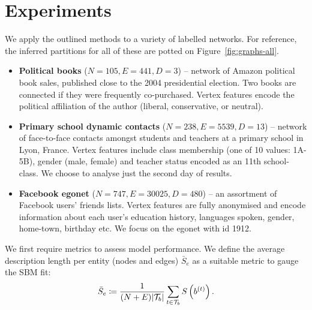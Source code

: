 \section{Experiments}
\label{sec:experiments}

We apply the outlined methods to a variety of labelled networks. For reference, the inferred partitions for all of these are potted on Figure~\ref{fig:graphs-all}.

\begin{itemize}
	\item \textbf{Political books} \cite{polbooks} ($N=105, E=441, D=3$) -- network of Amazon political book sales, published close to the 2004 presidential election. Two books are connected if they were frequently co-purchased. Vertex features encode the political affiliation of the author (liberal, conservative, or neutral).
	\item \textbf{Primary school dynamic contacts} \cite{schools} ($N=238, E=5539, D=13$) -- network of face-to-face contacts amongst students and teachers at a primary school in Lyon, France. Vertex features include class membership (one of 10 values: 1A-5B), gender (male, female) and teacher status encoded as an 11th school-class. We choose to analyse just the second day of results.
	\item \textbf{Facebook egonet} \cite{fb-snap} ($N=747, E=30025, D=480$) -- an assortment of Facebook users' friends lists. Vertex features are fully anonymised and encode information about each user's education history, languages spoken, gender, home-town, birthday etc. We focus on the egonet with id 1912.
\end{itemize}
%
We first require metrics to assess model performance. We define the average
description length per entity (nodes and edges) $\bar{S}_e$ as a suitable metric to gauge the SBM fit:
%
\begin{equation}
	\bar{S}_e \coloneqq \frac{1}{(N+E) |\mathcal{T}_b|} \sum_{t\in \mathcal{T}_b} S \left( b^{(t)} \right).
	\label{eqn:mean-dl}
\end{equation}


